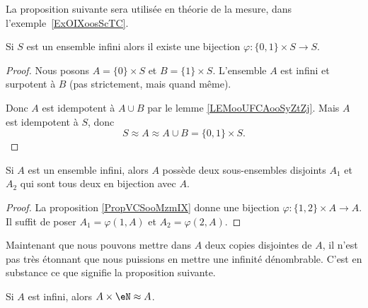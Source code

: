 La proposition suivante sera utilisée en théorie de la mesure, dans l'exemple~\ref{ExOIXoosScTC}.
\begin{proposition} \label{PropVCSooMzmIX}
    Si \( S\) est un ensemble infini alors il existe une bijection \( \varphi\colon \{ 0,1 \}\times S\to S\).
\end{proposition}

\begin{proof}
    Nous posons \( A=\{ 0 \}\times S\) et \( B=\{ 1 \}\times S\). L'ensemble \( A\) est infini et surpotent à \( B\) (pas strictement, mais quand même).

    Donc \( A\) est idempotent à \( A\cup B\) par le lemme \ref{LEMooUFCAooSyZtZj}. Mais \( A\) est idempotent à \( S\), donc
    \begin{equation}
        S\approx A \approx A\cup B=\{ 0,1 \}\times S.
    \end{equation}
\end{proof}

\begin{corollary}       \label{CORooJCSIooOeOICJ}
    Si \( A\) est un ensemble infini, alors \( A\) possède deux sous-ensembles disjoints \( A_1\) et \( A_2\) qui sont tous deux en bijection avec \( A\).
\end{corollary}

\begin{proof}
    La proposition \ref{PropVCSooMzmIX} donne une bijection \( \varphi\colon \{ 1,2 \}\times A\to A\). Il suffit de poser \( A_1=\varphi(1,A)\) et \( A_2=\varphi(2,A)\).
\end{proof}

Maintenant que nous pouvons mettre dans \( A\) deux copies disjointes de \( A\), il n'est pas très étonnant que nous puissions en mettre une infinité dénombrable. C'est en substance ce que signifie la proposition suivante.
\begin{proposition} \label{PROPooFKBEooKXqujV}
    Si \( A\) est infini, alors \( A\times \eN\approx A\).
\end{proposition}

